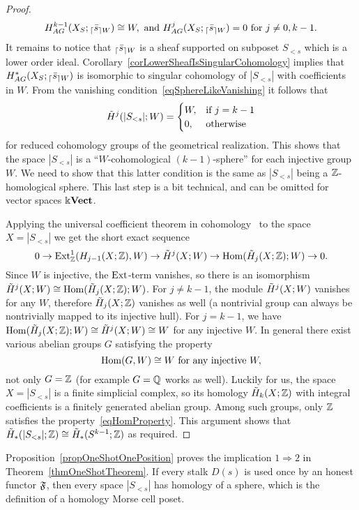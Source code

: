\begin{proof}
\begin{equation}
H^{k-1}_{AG}(X_S;{_{\lceil}\bar{s}_{\rceil W}})\cong W, \mbox{ and } H^{j}_{AG}(X_S;{_{\lceil}\bar{s}_{\rceil W}})=0\mbox{ for }j\neq 0,k-1.
\end{equation}
It remains to notice that ${_{\lceil}\bar{s}_{\rceil W}}$ is a sheaf supported on subposet $S_{<s}$ which is a lower order ideal. Corollary~\ref{corLowerSheafIsSingularCohomology} implies that $H^*_{AG}(X_S;{_{\lceil}\bar{s}_{\rceil W}})$ is isomorphic to singular cohomology of $|S_{<s}|$ with coefficients in $W$. From the vanishing condition~\eqref{eqSphereLikeVanishing} it follows that
\[
\tilde{H}^j(|S_{<s}|;W)=\begin{cases}
                    W, & \mbox{if } j=k-1 \\
                    0, & \mbox{otherwise}
                  \end{cases}
\]
for reduced cohomology groups of the geometrical realization. This shows that the space $|S_{<s}|$ is a ``$W$-cohomological $(k-1)$-sphere'' for each injective group $W$. We need to show that this latter condition is the same as $|S_{<s}|$ being a $\mathbb{Z}$-homological sphere. This last step is a bit technical, and can be omitted for vector spaces $\Bbbk\mathbf{Vect}$.

Applying the universal coefficient theorem in cohomology~\cite[p.195]{Hatcher} to the space $X=|S_{<s}|$ we get the short exact sequence
\[
0\to\operatorname{Ext}^1_{\mathbb{Z}}(H_{j-1}(X;\mathbb{Z}),W)\to \tilde{H}^j(X;W)\to \operatorname{Hom}(\tilde{H}_j(X;\mathbb{Z});W)\to 0.
\]
Since $W$ is injective, the $\operatorname{Ext}$-term vanishes, so there is an isomorphism $\tilde{H}^j(X;W)\cong \operatorname{Hom}(\tilde{H}_j(X;\mathbb{Z});W)$. For $j\neq k-1$, the module $\tilde{H}^j(X;W)$ vanishes for any $W$, therefore $\tilde{H}_j(X;\mathbb{Z})$ vanishes as well (a nontrivial group can always be nontrivially mapped to its injective hull). For $j=k-1$, we have $\operatorname{Hom}(\tilde{H}_j(X;\mathbb{Z});W)\cong \tilde{H}^j(X;W)\cong W$ for any injective $W$. In general there exist various abelian groups $G$ satisfying the property
\begin{equation}\label{eqHomProperty}
\operatorname{Hom}(G,W)\cong W \mbox{ for any injective } W,
\end{equation}
not only $G=\mathbb{Z}$ (for example $G=\mathbb{Q}$ works as well). Luckily for us, the space $X=|S_{<s}|$ is a finite simplicial complex, so its homology $\tilde{H}_k(X;\mathbb{Z})$ with integral coefficients is a finitely generated abelian group. Among such groups, only $\mathbb{Z}$ satisfies the property~\eqref{eqHomProperty}. This argument shows that $\tilde{H}_*(|S_{<s}|;\mathbb{Z})\cong \tilde{H}_*(S^{k-1};\mathbb{Z})$ as required.
\end{proof}

Proposition~\ref{propOneShotOnePosition} proves the implication $1\Rightarrow 2$ in Theorem~\ref{thmOneShotTheorem}. If every stalk $D(s)$ is used once by an honest functor $\mathfrak{F}$, then every space $|S_{<s}|$ has homology of a sphere, which is the definition of a homology Morse cell poset.

